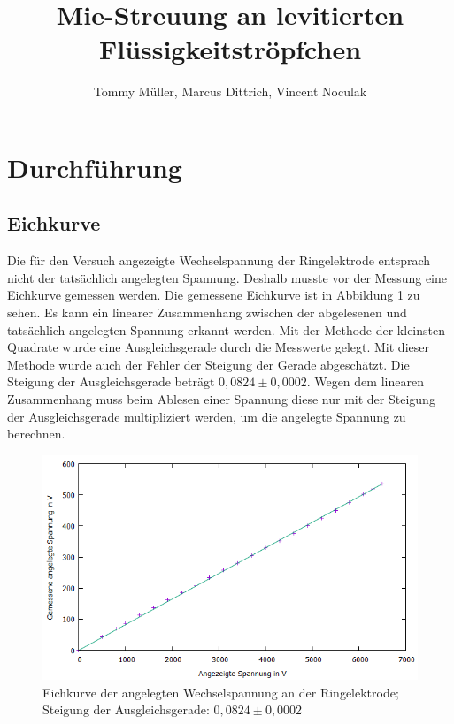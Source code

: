 \documentclass[10pt,a4paper]{article}
\author{Tommy Müller, Marcus Dittrich, Vincent Noculak}
\title{ Mie-Streuung an levitierten Flüssigkeitströpfchen}
\begin{document}
\maketitle
\newpage
\tableofcontents
\newpage

\section{Durchführung}

\subsection{Eichkurve}

Die für den Versuch angezeigte Wechselspannung der Ringelektrode entsprach nicht der tatsächlich angelegten Spannung. Deshalb musste vor der Messung eine Eichkurve gemessen werden. Die gemessene Eichkurve ist in Abbildung \ref{eichkurve1} zu sehen. Es kann ein linearer Zusammenhang zwischen der abgelesenen und tatsächlich angelegten Spannung erkannt werden. Mit der Methode der kleinsten Quadrate wurde eine Ausgleichsgerade durch die Messwerte gelegt. Mit dieser Methode wurde auch der Fehler der Steigung der Gerade abgeschätzt. Die Steigung der Ausgleichsgerade beträgt $0,0824 \pm 0,0002$. Wegen dem linearen Zusammenhang muss beim Ablesen einer Spannung diese nur mit der Steigung der Ausgleichsgerade multipliziert werden, um die angelegte Spannung zu berechnen.

\begin{figure}[h]
	\includegraphics[scale = 0.7]{eichkurve.png}
	\centering
	\caption{Eichkurve der angelegten Wechselspannung an der Ringelektrode; Steigung der Ausgleichsgerade: $0,0824 \pm 0,0002$}
	\label{eichkurve1}
\end{figure}
\end{document}
